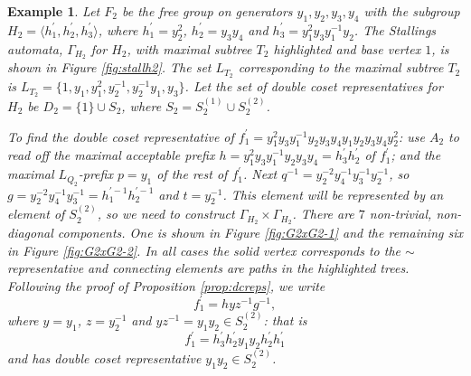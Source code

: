 \documentclass[a4paper,12pt]{article}
\newcommand{\G}{\Gamma }
\newtheorem{exam}[theorem]{Example}
\newenvironment{example}{\begin{exam} \rm}{\end{exam}}
\numberwithin{equation}{section}
\numberwithin{figure}{section}
\newcommand{\la}{\langle}
\newcommand{\ra}{\rangle}
\begin{document}
\begin{example}\label{ex:f_2}
Let $F_2$ be the free group on generators
$y_1,y_2,y_3,y_4$ with the subgroup $H_2 = \la h_1^{\prime},
h_2^{\prime},h_3^{\prime}\ra$, where
$h_1^{\prime}=y_2^2$,
$h_2^{\prime}=y_3y_4$ and
$h_3^{\prime}=y_1^2y_3y_1^{-1}y_2$.
The Stallings automata, $\G_{H_2}$ for $H_2$,
with maximal subtree $T_2$ highlighted and base vertex $1$, is shown
in Figure \ref{fig:stallh2}.
The set $L_{T_2}$ corresponding to the maximal subtree  $T_2$ is
 $L_{T_2}=
\{1, y_1, y_1^2,
y_2^{-1}, y_2^{-1}y_1, y_3 \}$.
Let the set of double coset representatives for $H_2$ be $D_2=\{1\}\cup S_2$, 
where $S_2=S_2^{(1)}
\cup S_2^{(2)}$.

To find the double coset representative 
of $f_1^\prime=y_1^2y_3y_1^{-1}y_2y_3y_4y_1y_2
y_3y_4y_2^2$: use ${A_2}$ to read off the maximal acceptable
prefix $h= y_1^2y_3y_1^{-1}y_2y_3y_4=h_3^\prime h_2^\prime$ of $f_1^\prime$; and  the maximal
$L_{Q_2}$-prefix $p=y_1$ of the rest of $f_1^\prime$.  Next $q^{-1}=
y_2^{-2}y_4^{-1}y_3^{-1}y_2^{-1}$, so $g=y_2^{-2}y_4^{-1}y_3^{-1}
=h_1^{\prime -1}h_2^{\prime -1}$
and $t=y_2^{-1}$. This element will be represented by an element
of $S_2^{(2)}$, so we need to construct $\G_{H_2}\times \G_{H_2}$.
There are $7$  non-trivial, non-diagonal components. One is shown
in Figure \ref{fig:G2xG2-1} and the remaining
six in Figure \ref{fig:G2xG2-2}. In all cases the solid vertex
corresponds to the $\sim$ representative and connecting elements
are paths in the highlighted trees. Following the proof of 
Proposition \ref{prop:dcreps}, 
we write 
\[f_1^\prime=h yz^{-1} g^{-1},\]
where $y=y_1$, $z=y_2^{-1}$ and $yz^{-1}=y_1y_2\in S_2^{(2)}$: that is
\[f_1^\prime=h^\prime_3h_2^\prime y_1y_2 h_2^\prime h_1^\prime\]
and has double coset representative $y_1y_2\in S_2^{(2)}$. 
\end{example}
\end{document}
